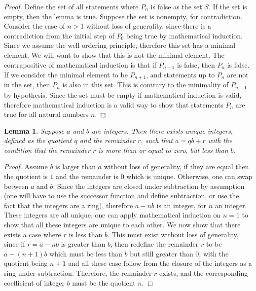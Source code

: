 \documentclass[10pt,twocolumn]{article}
\newtheorem{lemma}[theorem]{Lemma}
\begin{document}
\begin{proof}
    Define the set of all statements where $P_n$ is false as the set $S$. If the set is empty, then the lemma is true.
    Suppose the set is nonempty, for contradiction.
    Consider the case of $n > 1$ without loss of generality, since there is a contradiction from the initial step of $P_0$ being true 
    by mathematical induction.
    Since we assume the well ordering principle, therefore this set has a minimal element.
    We will want to show that this is not the minimal element.
    The contrapositive of mathematical induction is that if $P_{n+1}$ is false, then $P_{n}$ is false.
    If we consider the minimal element to be $P_{n+1}$, and statements up to $P_{n}$ are not in the set, then $P_{n}$ is also in this set.
    This is contrary to the minimality of $P_{n+1}$ by hypothesis.
    Since the set must be empty if mathematical induction is valid, therefore mathematical induction is a valid way to show that statements $P_n$ are true for all natural numbers $n$.
\end{proof}

\begin{lemma}
    Suppose $a$ and $b$ are integers. Then there exists unique integers, defined as the quotient $q$ and the remainder $r$, such that $a = qb + r$ with the condition that the remainder $r$ is more than or equal to zero, but less than $b$.
\end{lemma}

\begin{proof}
    Assume $b$ is larger than $a$ without loss of generality, if they are equal then the quotient is $1$ and the remainder is $0$ which is unique. Otherwise, one can swap between $a$ and $b$.
    Since the integers are closed under subtraction by assumption (one will have to use the successor function and define subtraction, or use the fact that the integers are a ring), therefore $a - nb$ is an integer, for $n$ an integer. These integers are all unique, one can apply mathematical induction on $n = 1$ to show that all these integers are unique to each other. We now show that there exists a case where $r$ is less than $b$. This must exist without loss of generality, since if $r = a - nb$ is greater than $b$, then redefine the remainder $r$ to be $a - (n+1)b$ which must be less than $b$ but still greater than $0$, with the quotient being $n+1$ and all these case follow from the closure of the integers as a ring under subtraction. Therefore, the remainder $r$ exists, and the corresponding coefficient of integer $b$ must be the quotient $n$.
\end{proof}
\end{document}

